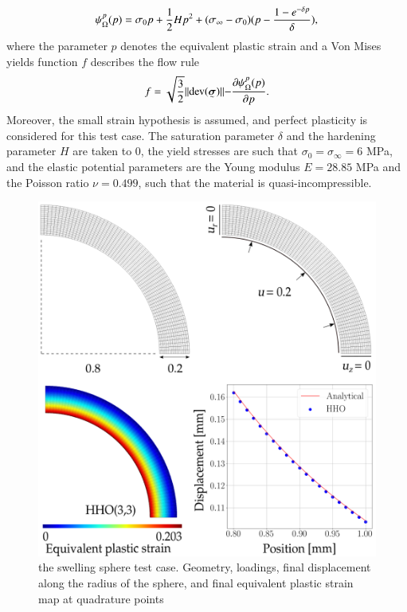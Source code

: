 \begin{equation}
    \psi{}_{\Omega{}}^p(p)
    =
    \sigma_0 p + \frac{1}{2} H p^2 + (\sigma_{\infty} - \sigma_0)(p - \frac{1 - e^{-\delta p}}{\delta}),
\end{equation}
%
%
%
where the parameter $p$ denotes the equivalent plastic strain and a Von Mises yields function $f$ describes the flow rule
%
%
%
\begin{equation}
    f = \sqrt{\frac{3}{2}} \rVert \text{dev} (\tensorii{\sigma}) \lVert - \frac{\partial \mecPotential{}_{\bodyLag{}}^p(p)}{\partial p}.
\end{equation}
%
%
%
Moreover, the small strain hypothesis is assumed, and
perfect plasticity is considered for this test case. The saturation parameter $\delta$ and the hardening parameter $H$ are taken to $0$, the yield stresses are such that $\sigma_0 = \sigma_{\infty} = 6$ MPa, and the elastic potential parameters are the Young modulus $E = 28.85$ MPa and the Poisson ratio $\nu = 0.499$, such that the material is quasi-incompressible.

\begin{figure}[H]
    \centering
    \includegraphics[width=12.cm]{../chapter_002_hho_mechanics/figures/sphere_mesh.png}
    \caption{the swelling sphere test case. Geometry, loadings, final displacement along the radius of the sphere, and final equivalent plastic strain map at quadrature points}
    \label{fig_sphereall}
\end{figure}

